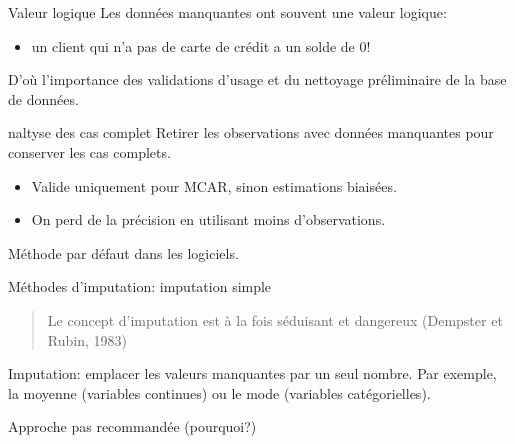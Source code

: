 \documentclass[
  ignorenonframetext,
]{beamer}
\providecommand{\tightlist}{%
  \setlength{\itemsep}{0pt}\setlength{\parskip}{0pt}}\usepackage{longtable,booktabs,array}
\begin{document}
\begin{frame}{Valeur logique}
\protect\hypertarget{valeur-logique}{}
Les données manquantes ont souvent une valeur logique:

\begin{itemize}
\tightlist
\item
  un client qui n'a pas de carte de crédit a un solde de 0!
\end{itemize}

D'où l'importance des validations d'usage et du nettoyage préliminaire
de la base de données.
\end{frame}

\begin{frame}{naltyse des cas complet}
\protect\hypertarget{naltyse-des-cas-complet}{}
Retirer les observations avec données manquantes pour conserver les cas
complets.

\begin{itemize}
\tightlist
\item
  Valide uniquement pour MCAR, sinon estimations biaisées.
\item
  On perd de la précision en utilisant moins d'observations.
\end{itemize}

Méthode par défaut dans les logiciels.
\end{frame}

\begin{frame}{Méthodes d'imputation: imputation simple}
\protect\hypertarget{muxe9thodes-dimputation-imputation-simple}{}
\begin{quote}
Le concept d'imputation est à la fois séduisant et dangereux (Dempster
et Rubin, 1983)
\end{quote}

Imputation: emplacer les valeurs manquantes par un seul nombre. Par
exemple, la moyenne (variables continues) ou le mode (variables
catégorielles).

Approche pas recommandée (pourquoi?)
\end{frame}
\end{document}
